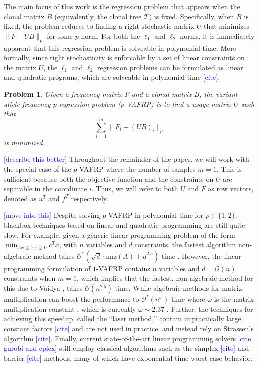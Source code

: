 \documentclass[10pt]{article}
\newtheorem{problem}{Problem}
\newcommand{\henri}[1]{\textcolor{blue}{[#1]}}
\newcommand{\tree}{\mathcal{T}}
\begin{document}
The main focus of this work is the regression problem that appears when the
clonal matrix $B$ (equivalently, the clonal tree $\tree$) is fixed. Specifically,
when $B$ is fixed, the problem reduces to finding a right stochastic matrix $U$
that minimizes $\lVert F - UB\lVert_p$ for some $p$-norm. For both the $\ell_1$ and $\ell_2$ norms, 
it is immediately apparent that this regression problem is solveable in polynomial time. 
More formally, since right stochasticity is enforcable by a set of linear constraints on the matrix $U$,
the $\ell_1$ and $\ell_2$ regression problems can be formulated as linear and quadratic programs, 
which are solveable in polynomial time \henri{cite}. 

\begin{problem}
  \label{prob:vafpp}
  Given a frequency matrix $F$ and a clonal matrix $B$, the 
  \emph{variant allele frequency $p$-regression problem} ($p$-VAFRP) is to
  find a usage matrix $U$ such that 
  \begin{equation}
    \sum_{i=1}^m\lVert F_i - (UB)_i \rVert_p
  \end{equation}
  is minimized.
\end{problem}

\henri{describe this better}
Throughout the remainder of the paper, we will work with the special case of 
the $p$-VAFRP where the number of samples $m = 1$. This is sufficient because both the objective 
function and the constraints on $U$ are separable in the coordinate 
$i$. Thus, we will refer to both $U$ and $F$ as row vectors, denoted as $u^T$ and $f^T$ 
respectively.

\henri{move into this}
Despite solving $p$-VAFRP in polynomial time for $p \in \{1, 2\}$, blackbox techniques based on 
linear and quadratic programming are still quite slow. For example, given a generic linear programming
problem of the form $\min_{Ax \leq b, x \geq 0} c^Tx$, with $n$ variables and $d$ constraints, the fastest
algorithm non-algebraic method \cite{cohen2021solving} takes 
$\mathcal{O}^*\left(\sqrt{d}\cdot\text{nnz}(A)+d^{2.5}\right)$ time \cite{lee2014path, lee2015efficient}. 
However, the linear programming formulation of $1$-VAFRP contains $n$ variables and 
$d = \mathcal{O}(n)$ constraints when $m = 1$, which implies that the fastest, non-algebraic method for this due to 
Vaidya \cite{vaidya1987algorithm, vaidya1996new}, takes $\mathcal{O}(n^{2.5})$ time. While algebraic methods
for matrix multiplication can boost the performance to $\mathcal{O}^*(n^{\omega})$ time where $\omega$ is
the matrix multiplication constant \cite{cohen2021solving}, which is currently $\omega \sim 2.37$ 
\cite{alman2021refined}. Further, the techniques for achieving this speedup, called the ``laser method,'' contain
impractically large constant factors \henri{cite} and are not used in practice, and instead rely on Strassen's algorithm \henri{cite}.
Finally, current state-of-the-art linear programming 
solvers \henri{cite gurobi and cplex} still employ classical algorithms such
as the simplex \henri{cite} and barrier \henri{cite} methods, many of which have exponential time 
worst case behavior.
\end{document}
